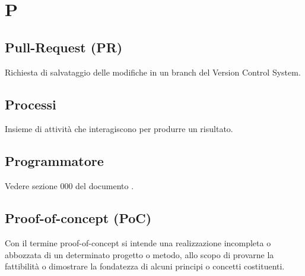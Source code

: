 \section{P}
	\subsection{Pull-Request (PR)}  
		Richiesta di salvataggio delle modifiche in un branch del Version Control System.
	\subsection{Processi}  
		Insieme di attività che interagiscono per produrre un risultato.
	\subsection{Programmatore} 
		Vedere sezione 000 del documento .
	\subsection{Proof-of-concept (PoC) }  
		Con il termine proof-of-concept si intende una realizzazione incompleta o abbozzata di un determinato progetto o metodo, allo scopo di provarne la fattibilità o dimostrare la fondatezza di alcuni principi o concetti costituenti.





\newpage
